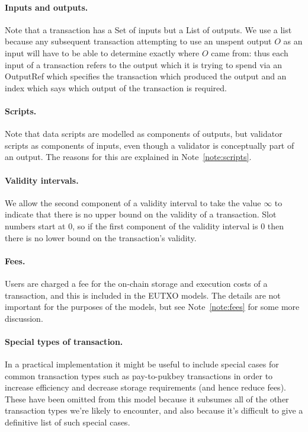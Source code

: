 \documentclass[a4paper]{article}
\newcounter{note}
\newcommand{\todompj}[1]{\todo[inline,color=yellow!40,author=Michael]{#1}}
\newcommand{\s}{\textsf}  %
\begin{document}
\paragraph{Inputs and outputs. } Note that a transaction has a
\textsf{Set} of inputs but a \textsf{List} of outputs. We use a list
because any subsequent transaction attempting to use an unspent output
$O$ as an input will have to be able to determine exactly where $O$
came from: thus each input of a transaction refers to the output which
it is trying to spend via an \s{OutputRef} which specifies the
transaction which produced the output and an index which says which
output of the transaction is required.


\paragraph{Scripts.} Note that data scripts are modelled as components
of outputs, but validator scripts as components of inputs, even though
a validator is conceptually part of an output.  The reasons for this are
explained in Note~\ref{note:scripts}.

\paragraph{Validity intervals.} We allow the second component of a
validity interval to take the value $\infty$ to indicate that there is
no upper bound on the validity of a transaction.  Slot numbers start
at 0, so if the first component of the validity interval is 0
then there is no lower bound on the transaction's validity.

\paragraph{Fees.}  Users are charged a fee for the on-chain storage
and execution costs of a transaction, and this is included in the
EUTXO models.  The details are not important for the purposes of the
models, but see Note~\ref{note:fees} for some more discussion.

\paragraph{Special types of transaction.} In a practical
implementation it might be useful to include special cases for common
transaction types such as pay-to-pukbey transactions in order to
increase efficiency and decrease storage requirements (and hence
reduce fees).  These have been omitted from this model because it
subsumes all of the other transaction types we're likely to encounter,
and also because it's difficult to give a definitive list of such
special cases.
\end{document}

